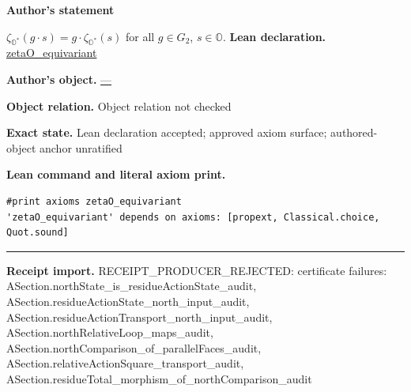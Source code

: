 \documentclass[11pt]{article}
\newcommand{\OO}{\mathbb{O}}
\newcommand{\Ostar}{\OO^{*}}
\newcommand{\zetaO}{\zeta_{\Ostar}}
\providecommand{\Gtwo}{G_2}
\theoremstyle{plain}
\theoremstyle{definition}
\theoremstyle{remark}
\begin{document}
\medskip
\begin{tcolorbox}[provenancecard,title={32. Theorem - \$\textbackslash{}Gtwo\$-equivariance},title after break={32. Theorem - \$\textbackslash{}Gtwo\$-equivariance (continued)}]
\textbf{Author's statement}\par
$\zetaO(g\cdot s)=g\cdot\zetaO(s)$ for all $g\in\Gtwo$, $s\in\OO$.
\tcblower
\textbf{Lean declaration.} \url{zetaO_equivariant}
\par\textbf{Author's object.} \url{—}
\par\textbf{Object relation.} Object relation not checked
\par\textbf{Exact state.} Lean declaration accepted; approved axiom surface; authored-object anchor unratified
\par\smallskip\textbf{Lean command and literal axiom print.}
\begin{Verbatim}[breaklines=true,breakanywhere=true,fontsize=\small]
#print axioms zetaO_equivariant
'zetaO_equivariant' depends on axioms: [propext, Classical.choice, Quot.sound]
\end{Verbatim}
\medskip\hrule\medskip
\textbf{Receipt import.} \textcolor{KgtRed}{RECEIPT\_PRODUCER\_REJECTED: certificate failures: ASection.northState\_is\_residueActionState\_audit, ASection.residueActionState\_north\_input\_audit, ASection.residueActionTransport\_north\_input\_audit, ASection.northRelativeLoop\_maps\_audit, ASection.northComparison\_of\_parallelFaces\_audit, ASection.relativeActionSquare\_transport\_audit, ASection.residueTotal\_morphism\_of\_northComparison\_audit}
\end{tcolorbox}
\medskip
\end{document}
